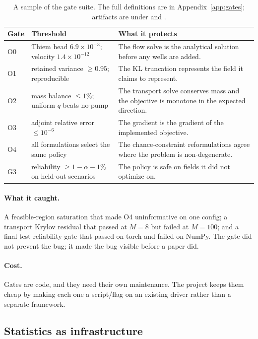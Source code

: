 \begin{table}[htbp]
\centering
\small
\begin{tabularx}{\textwidth}{@{}llX@{}}
\toprule
Gate & Threshold & What it protects \\
\midrule
O0 & Thiem head $6.9\times10^{-3}$; velocity $1.4\times10^{-12}$ &
The flow solve is the analytical solution before any wells are added. \\
O1 & retained variance $\ge0.95$; reproducible &
The KL truncation represents the field it claims to represent. \\
O2 & mass balance $\le1\%$; uniform $q$ beats no-pump &
The transport solve conserves mass and the objective is monotone in the
expected direction. \\
O3 & adjoint relative error $\le10^{-6}$ &
The gradient is the gradient of the implemented objective. \\
O4 & all formulations select the same policy &
The chance-constraint reformulations agree where the problem is non-degenerate. \\
G3 & reliability $\ge1-\alpha-1\%$ on held-out scenarios &
The policy is safe on fields it did not optimize on. \\
\bottomrule
\end{tabularx}
\caption{A sample of the gate suite. The full definitions are in
Appendix~\ref{app:gates}; artifacts are under 
and .}
\label{tab:gates}
\end{table}

\paragraph{What it caught.} A feasible-region saturation that made O4
uninformative on one config; a transport Krylov residual that passed at
$M=8$ but failed at $M=100$; and a final-test reliability gate that passed on
torch and failed on NumPy. The gate did not prevent the bug; it made the bug
visible before a paper did.

\paragraph{Cost.} Gates are code, and they need their own maintenance. The
project keeps them cheap by making each one a script/flag on an existing driver
rather than a separate framework.

\subsection{Statistics as infrastructure}
\label{sec:stats}

